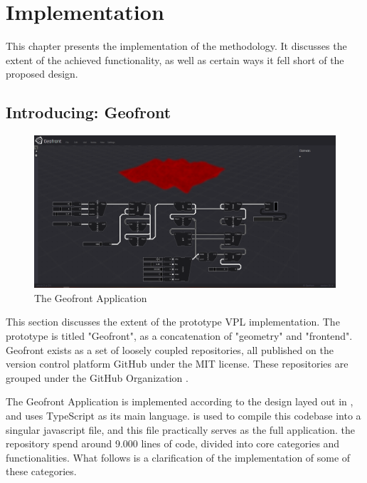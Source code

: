 \chapter{Implementation}%
\label{chap:implementation}
This chapter presents the implementation of the methodology. 
It discusses the extent of the achieved functionality, as well as certain ways it fell short of the proposed design.

\section{Introducing: Geofront}
\label{sec:implementation:app}

\begin{note}
  
\end{note}

\begin{figure}
  \centering
  \graphicspath{ {../../assets/images/implementation/} }
  \includegraphics[width=\linewidth]{full-application.png}
  \caption[Geofront]{The Geofront Application}
  \label{fig:geofront-app}
\end{figure}

This section discusses the extent of the prototype \ac{VPL} implementation. 
The prototype is titled "Geofront", as a concatenation of "geometry" and "frontend".
Geofront exists as a set of loosely coupled repositories, all published on the version control platform GitHub under the MIT license. These repositories are grouped under the GitHub Organization  .


The Geofront Application is implemented according to the design layed out in , and uses TypeScript as its main language. 
 is used to compile this codebase into a singular javascript file, and this file practically serves as the full application. 
the repository spend around 9.000 lines of code, divided into core categories and functionalities.
What follows is a clarification of the implementation of some of these categories.

